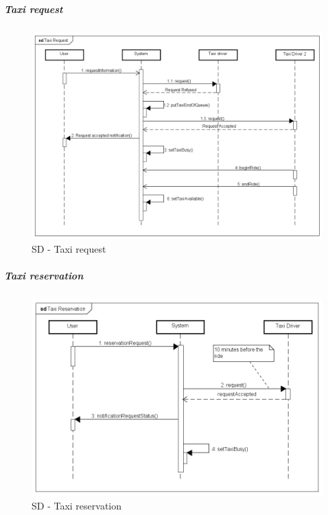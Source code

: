 \newpage
\subparagraph{Taxi request}
\noindent
    \begin{figure}[H]
        \includegraphics[width=\textwidth]{./Diagrams/TaxiRequest.png}
        \caption{SD - Taxi request}
        \centering
    \end{figure}
\newpage
\subparagraph{Taxi reservation}
\noindent
    \begin{figure}[H]
        \includegraphics[width=\textwidth]{./Diagrams/TaxiReservation.png}
        \caption{SD - Taxi reservation}
        \centering
    \end{figure}


